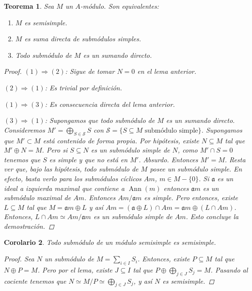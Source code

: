 \documentclass[12pt]{book}
\newtheorem{teo}{Teorema}[section]
\newtheorem{cor}[teo]{Corolario}
\theoremstyle{definition}
\DeclareMathOperator{\ann}{Ann}
\begin{document}
\begin{teo}
Sea $M$ un $A$-módulo. Son equivalentes:
\begin{enumerate}
\item $M$ es semisimple.
\item $M$ es suma directa de submódulos simples.
\item Todo submódulo de $M$ es un sumando directo.
\end{enumerate}
\begin{proof}
$(1)\Longrightarrow (2)$: Sigue de tomar $N=0$ en el lema anterior.

$(2)\Longrightarrow (1)$: Es trivial por definición.

$(1)\Longrightarrow (3)$: Es consecuencia directa del lema anterior.

$(3)\Longrightarrow (1)$: Supongamos que todo submódulo de $M$ es un sumando directo. Consideremos $M' = \displaystyle\bigoplus_{S\in\mathcal{S}}S$ con $\mathcal{S}=\{S\subseteq M \text{ submódulo simple}\}$. Supongamos que $M'\subset M$ está contenido de forma propia. Por hipótesis, existe $N\subseteq M$ tal que $M'\oplus N=M$. Pero si $S\subseteq N$ es un submódulo simple de $N$, como $M'\cap S=0$ tenemos que $S$ es simple y que no está en $M'$. Absurdo. Entonces $M'=M$. Resta ver que, bajo las hipótesis, todo submódulo de $M$ posee un submódulo simple. En efecto, basta verlo para los submódulos cíclicos $Am$, $m\in M - \{0\}$. Si $\mathfrak{a}$ es un ideal a izquierda maximal que contiene a $\ann(m)$ entonces $\mathfrak{a}m$ es un submódulo maximal de $Am$. Entonces $Am/\mathfrak{a}m$ es simple. Pero entonces, existe $L\subseteq M$ tal que $M=\mathfrak{a}m\oplus L$ y así $Am = (\mathfrak{a}\oplus L)\cap Am = \mathfrak{a}m\oplus (L\cap Am)$. Entonces, $L\cap Am \simeq Am/\mathfrak{a}m$ es un submódulo simple de $Am$. Esto concluye la demostración.
\end{proof}
\end{teo}

\begin{cor}
Todo submódulo de un módulo semisimple es semisimple.
\begin{proof}
Sea $N$ un submódulo de $M = \displaystyle\sum_{i\in I}S_i$. Entonces, existe $P\subseteq M$ tal que $N\oplus P = M$. Pero por el lema, existe $J\subseteq I$ tal que $P\oplus \displaystyle\bigoplus_{j\in J}S_j = M$. Pasando al cociente tenemos que $N\simeq M/P \simeq \displaystyle\bigoplus_{j\in J} S_j$, y así $N$ es semisimple. 
\end{proof}
\end{cor}
\end{document}
